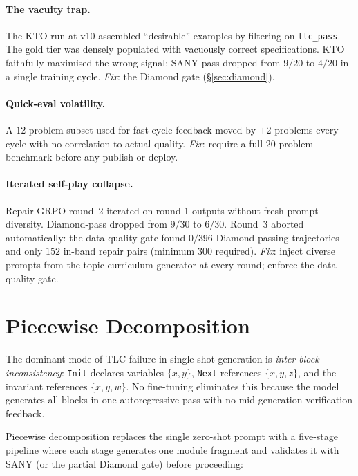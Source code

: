 \documentclass[10pt,twocolumn]{article}
\begin{document}
\paragraph{The vacuity trap.}
The KTO run at v10 assembled ``desirable'' examples by filtering on
\texttt{tlc\_pass}.
The gold tier was densely populated with vacuously correct specifications.
KTO faithfully maximised the wrong signal: SANY-pass dropped from $9/20$ to
$4/20$ in a single training cycle.
\textit{Fix}: the Diamond gate (\S\ref{sec:diamond}).

\paragraph{Quick-eval volatility.}
A $12$-problem subset used for fast cycle feedback moved by $\pm 2$ problems
every cycle with no correlation to actual quality.
\textit{Fix}: require a full $20$-problem benchmark before any publish or deploy.

\paragraph{Iterated self-play collapse.}
Repair-GRPO round~2 iterated on round-1 outputs without fresh prompt diversity.
Diamond-pass dropped from $9/30$ to $6/30$.
Round~3 aborted automatically: the data-quality gate found $0/396$
Diamond-passing trajectories and only $152$ in-band repair pairs (minimum
$300$ required).
\textit{Fix}: inject diverse prompts from the topic-curriculum generator at
every round; enforce the data-quality gate.

\section{Piecewise Decomposition}
\label{sec:piecewise}

The dominant mode of TLC failure in single-shot generation is
\emph{inter-block inconsistency}: \texttt{Init} declares variables
$\{x, y\}$, \texttt{Next} references $\{x, y, z\}$, and the invariant
references $\{x, y, w\}$.
No fine-tuning eliminates this because the model generates all blocks in one
autoregressive pass with no mid-generation verification feedback.

Piecewise decomposition replaces the single zero-shot prompt with a five-stage
pipeline where each stage generates one module fragment and validates it with
SANY (or the partial Diamond gate) before proceeding:
\end{document}
